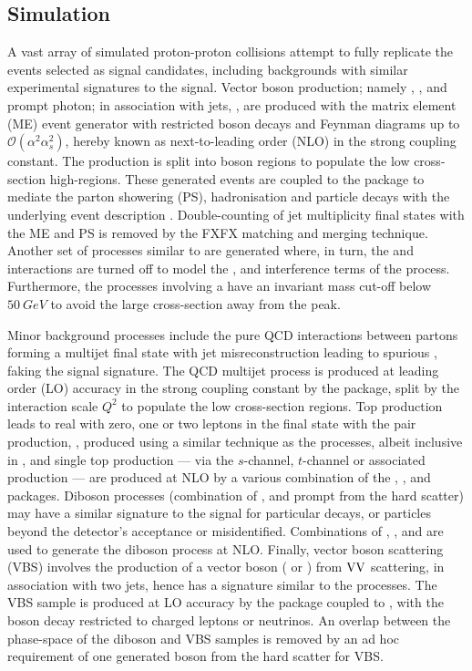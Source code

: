 \subsection{Simulation}

A vast array of simulated proton-proton collisions attempt to fully replicate
the events selected as signal candidates, including backgrounds with similar
experimental signatures to the signal. Vector boson production; namely \IZvv,
\IWlv, \IDYll and prompt photon; in association with jets, \IVj, are produced
with the matrix element (ME) event generator \MADGRAPH \cite{Frederix:2018nkq}
with restricted boson decays and Feynman diagrams up to
$\mathcal{O}(\alpha^2\alpha_s^2)$, hereby known as next-to-leading order (NLO)
in the strong coupling constant. The production is split into boson \pt
regions to populate the low cross-section high-\pt regions. These generated
events are coupled to the \PYTHIA package \cite{Sjostrand:2014zea} to mediate
the parton showering (PS), hadronisation and particle decays with the \CUET
underlying event description \cite{Khachatryan:2015pea}. Double-counting of
jet multiplicity final states with the ME and PS is removed by the FXFX
\cite{Frederix:2012ps} matching and merging technique. Another set of
processes similar to \IDYll are generated where, in turn, the \PZ and \Pgstar
interactions are turned off to model the \PZ, \Pgstar and interference terms
of the \IDYll process. Furthermore, the processes involving a \Pgstar have an
invariant mass cut-off below ${\SI{50}{GeV}}$ to avoid the large cross-section
away from the \PZ peak.

Minor background processes include the pure QCD interactions between partons
forming a multijet final state with jet misreconstruction leading to spurious
\ptmiss, faking the signal signature. The QCD multijet process is produced at
leading order (LO) accuracy in the strong coupling constant by the \PYTHIA
package, split by the interaction scale $Q^2$ to populate the low
cross-section regions. Top production leads to real \ptmiss with zero, one or
two leptons in the final state with the pair production, \Ittj, produced using
a similar technique as the \IVj processes, albeit inclusive in \pt, and single
top production --- via the $s$-channel, $t$-channel or associated \PW
production --- are produced at NLO by a various combination of the \MADGRAPH,
\MADSPIN \cite{Artoisenet:2012st}, \PYTHIA and \POWHEG
\cite{Alioli:2010xd,Alioli:2009je,Re:2010bp} packages. Diboson processes
(combination of \PZ, \PW and prompt \Pgamma from the hard scatter) may have a
similar signature to the signal for particular decays, or particles beyond the
detector's acceptance or misidentified. Combinations of \MADGRAPH, \MADSPIN,
\PYTHIA and \POWHEG are used to generate the diboson process at NLO. Finally,
vector boson scattering (VBS) involves the production of a vector boson (\PW
or \PZ) from $\mathrm{V}\mathrm{V}$ scattering, in association with two jets, hence has a
signature similar to the \IVj processes. The VBS sample is produced at LO
accuracy by the \MADGRAPH package coupled to \PYTHIA, with the boson decay
restricted to charged leptons or neutrinos. An overlap between the phase-space
of the diboson and VBS samples is removed by an ad hoc requirement of one
generated boson from the hard scatter for VBS.

